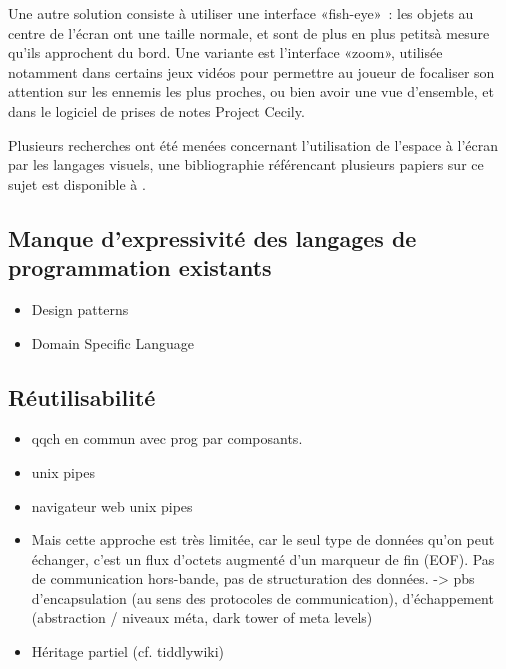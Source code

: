 \documentclass{article}
\begin{document}
Une autre solution consiste à utiliser une interface «fish-eye»~: les objets au centre de l'écran ont une taille normale, et sont de plus en
plus petitsà mesure qu'ils approchent du bord. Une variante est l'interface «zoom», utilisée notamment dans certains jeux
vidéos\cite{mutant-storm} pour permettre au joueur de focaliser son attention sur les ennemis les plus proches, ou bien avoir une vue
d'ensemble, et dans le logiciel de prises de notes Project Cecily\cite{project-cecily}.

Plusieurs recherches ont été menées concernant l'utilisation de l'espace à l'écran par les langages visuels, une bibliographie référencant
plusieurs papiers sur ce sujet est disponible à \cite{biblio-vpl-a-screen-real-estate}.


\subsection[Manque d'expressivité]{Manque d'expressivité des langages de programmation existants}
\begin{itemize}
\item Design patterns
\item Domain Specific Language
\end{itemize}

\subsection{Réutilisabilité}

\begin{itemize}
\item qqch en commun avec prog par composants.
\item unix pipes
\item navigateur web unix pipes
\item Mais cette approche est très limitée, car le seul type de données qu'on peut échanger, c'est un flux d'octets augmenté d'un marqueur
  de fin (EOF). Pas de communication hors-bande, pas de structuration des données. -> pbs d'encapsulation (au sens des protocoles de
  communication), d'échappement (abstraction / niveaux méta, dark tower of meta levels)
\item Héritage partiel (cf. tiddlywiki)
\end{itemize}
\end{document}
